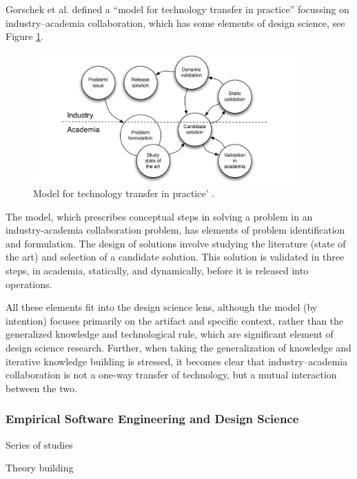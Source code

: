 \documentclass[graybox]{svmult}
\begin{document}
Gorschek et al. defined a ``model for technology transfer in practice'' \cite{GorschekSW2006} focussing on industry--academia collaboration, which has some elements of design science, see Figure \ref{fig:GorschekModel}.

\begin{figure}
  \includegraphics[width=0.9\textwidth]{Figures/GorschekModel.pdf}
\caption{Model for technology transfer in practice' \cite{GorschekSW2006}.}
\label{fig:GorschekModel}       %
\end{figure}

The model, which prescribes conceptual steps in solving a problem in an industry-academia collaboration problem, has elements of problem identification and formulation. The design of solutions involve studying the literature (state of the art) and selection of a candidate solution. This solution is validated in three steps, in academia, statically, and dynamically, before it is released into operations. 

All these elements fit into the design science lens, although the model (by intention) focuses primarily on the artifact and specific context, rather than the generalized knowledge and technological rule, which are significant element of design science research. Further, when taking the generalization of knowledge and iterative knowledge building is stressed, it becomes clear that industry--academia collaboration is not a one-way transfer of technology, but a mutual interaction between the two.

\subsubsection{Empirical Software Engineering and Design Science}

Series of studies

Theory building
\end{document}
